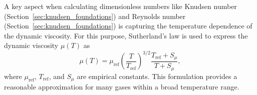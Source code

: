 A key aspect when calculating dimensionless numbers like Knudsen number (Section~\ref{sec:knudsen_foundations}) and Reynolds number (Section~\ref{sec:knudsen_foundations}) is capturing the temperature dependence of the dynamic viscosity.
For this purpose, Sutherland's law is used to express the dynamic viscosity $\mu(T)$ as 
\begin{equation}
  \mu(T)
  = \mu_{\text{ref}}
    \left(\frac{T}{T_{\text{ref}}}\right)^{3/2}
    \frac{T_{\text{ref}} + S_\mu}{T + S_\mu},
	\label{eq:sutherland}
\end{equation}
where $\mu_{\text{ref}}$, $T_{\text{ref}}$, and $S_\mu$ are empirical constants.
This formulation provides a reasonable approximation for many gases within a broad temperature range.

